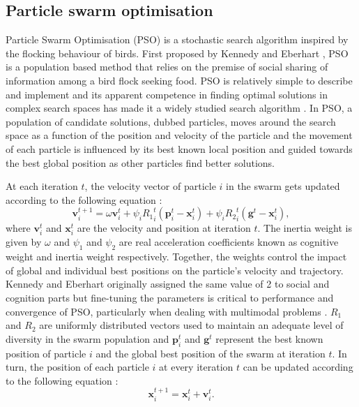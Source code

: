 	
	\subsection{Particle swarm optimisation}
	
	Particle Swarm Optimisation (PSO) is a stochastic search algorithm inspired by the flocking behaviour of birds. First proposed by Kennedy and Eberhart \cite{Eberhart:1995aa,Kennedy95}, PSO is a population based method that relies on the premise of social sharing of information among a bird flock seeking food. PSO is relatively simple to describe and implement and its apparent competence in finding optimal solutions in complex search spaces has made it a widely studied search algorithm \cite{Freitas:2020aa}. In PSO, a population of candidate solutions, dubbed particles, moves around the search space as a function of the position and velocity of the particle and the movement of each particle is influenced by its best known local position and guided towards the best global position as other particles find better solutions. 

	At each iteration $t$, the velocity vector of particle $i$ in the swarm gets updated according to the following equation \cite{Bonyadi:2017aa}:
	\begin{equation} \label{eq:PSO_vel}
		\mathbf{v}_i^{t+1} = \omega \mathbf{v}_i^{t} + \psi_i {R_1}_i^t \left( \mathbf{p}_i^{t} - \mathbf{x}_i^{t} \right) +\psi_i {R_2}_i^t \left( \mathbf{g}^{t} - \mathbf{x}_i^{t} \right),
	\end{equation}
	where $\mathbf{v}_i^t$ and $\mathbf{x}_i^t$ are the velocity and position at iteration $t$. The inertia weight is given by $\omega$ and $\psi_1$ and $\psi_2$ are real acceleration coefficients known as cognitive weight and inertia weight respectively. Together, the weights control the impact of global and individual best positions on the particle's velocity and trajectory. Kennedy and Eberhart \cite{Kennedy95} originally assigned the same value of \num{2} to social and cognition parts but fine-tuning the parameters is critical to performance and convergence of PSO, particularly when dealing with multimodal problems \cite{Carlisle:2001aa,Trelea:2003aa,van-den-Bergh:2006aa}. $R_1$ and $R_2$ are uniformly distributed vectors used to maintain an adequate level of diversity in the swarm population and $\mathbf{p}_i^{t}$ and $\mathbf{g}^{t}$ represent the best known position of particle $i$ and the global best position of the swarm at iteration $t$. In turn, the position of each particle $i$ at every iteration $t$ can be updated according to the following equation \cite{Bonyadi:2017aa}:
	\begin{equation}  \label{eq:PSO_pos}
		\mathbf{x}_i^{t+1} = \mathbf{x}_i^{t} + \mathbf{v}_i^{t}.
	\end{equation}
	
